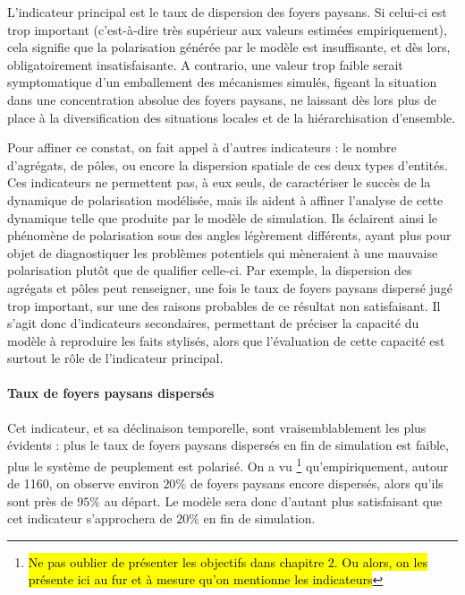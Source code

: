 L'indicateur principal est le taux de dispersion des foyers paysans.
Si celui-ci est trop important (c'est-à-dire très supérieur aux valeurs estimées empiriquement), cela signifie que la polarisation générée par le modèle est insuffisante, et dès lors, obligatoirement insatisfaisante.
A contrario, une valeur trop faible serait symptomatique d'un emballement des mécanismes simulés, figeant la situation dans une concentration absolue des foyers paysans, ne laissant dès lors plus de place à la diversification des situations locales et de la hiérarchisation d'ensemble.

Pour affiner ce constat, on fait appel à d'autres indicateurs :
le nombre d'agrégats, de pôles, ou encore la dispersion spatiale de ces deux types d'entités.
Ces indicateurs ne permettent pas, à eux seuls, de caractériser le succès de la dynamique de polarisation modélisée, mais ils aident à affiner l'analyse de cette dynamique telle que produite par le modèle de simulation.
Ils éclairent ainsi le phénomène de polarisation sous des angles légèrement différents, ayant plus pour objet de diagnostiquer les problèmes potentiels qui mèneraient à une mauvaise polarisation plutôt que de qualifier celle-ci.
Par exemple, la dispersion des agrégats et pôles peut renseigner, une fois le taux de foyers paysans dispersé jugé trop important, sur une des raisons probables de ce résultat non satisfaisant.
Il s'agit donc d'indicateurs secondaires, permettant de préciser la capacité du modèle à reproduire les faits stylisés, alors que l'évaluation de cette capacité est surtout le rôle de l'indicateur principal.

\paragraph{Taux de foyers paysans dispersés}

Cet indicateur, et sa déclinaison temporelle, sont vraisemblablement les plus évidents :
plus le taux de foyers paysans dispersés en fin de simulation est faible, plus le système de peuplement est polarisé.
On a vu \footnote{\hl{Ne pas oublier de présenter les objectifs dans chapitre 2. Ou alors, on les présente ici au fur et à mesure qu'on mentionne les indicateurs}} qu'empiriquement, autour de 1160, on observe environ $20\%$ de foyers paysans encore dispersés, alors qu'ils sont près de $95\%$ au départ.
Le modèle sera donc d'autant plus satisfaisant que cet indicateur s'approchera de $20\%$ en fin de simulation.

